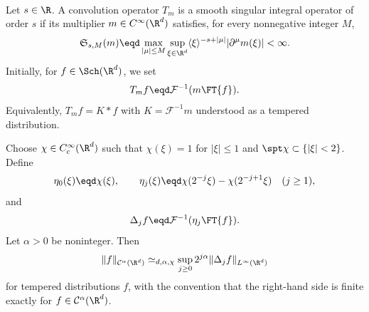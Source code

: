 {}

\

\begin{definition}
  \label{def:smooth-convolution-singular-integrals}Let $s \in \R$. A
  convolution operator $T_m$ is a smooth singular integral operator of order
  $s$ if its multiplier $m \in C^{\infty} (\R^d)$ satisfies, for every
  nonnegative integer $M$,
  \begin{equation}
    \label{eq:symbol-seminorm} \mathfrak{S}_{s, M} (m) \eqd \max_{| \mu | \le
    M} \sup_{\xi \in \R^d} \langle \xi \rangle^{- s + | \mu |}  |
    \partial^{\mu} m (\xi) | < \infty .
  \end{equation}
  Initially, for $f \in \Sch (\R^d)$, we set
  \[ T_m f \eqd \mathcal{F}^{- 1} (m \FT{f}) . \]
  Equivalently, $T_m f = K \ast f$ with $K =\mathcal{F}^{- 1} m$ understood as
  a tempered distribution.
\end{definition}

{}

\begin{lemma}
  \label{lem:lp-holder-characterization}Choose $\chi \in C_c^{\infty} (\R^d)$
  such that $\chi (\xi) = 1$ for $| \xi | \le 1$ and $\spt \chi \subset \{|
  \xi | < 2\}$. Define
  \[ \eta_0 (\xi) \eqd \chi (\xi), \qquad \eta_j (\xi) \eqd \chi (2^{- j} \xi)
     - \chi (2^{- j + 1} \xi)  \quad (j \ge 1), \]
  and
  \[ \Delta_j f \eqd \mathcal{F}^{- 1} (\eta_j \FT{f}) . \]
  Let $\alpha > 0$ be noninteger. Then
  \begin{equation}
    \label{eq:lp-holder-characterization} \|f\|_{\mathcal{C}^{\alpha} (\R^d)}
    \simeq_{d, \alpha, \chi} \sup_{j \ge 0} 2^{j \alpha}  \| \Delta_j
    f\|_{L^{\infty} (\R^d)}
  \end{equation}
  for tempered distributions $f$, with the convention that the right-hand side
  is finite exactly for $f \in \mathcal{C}^{\alpha} (\R^d)$.
\end{lemma}

